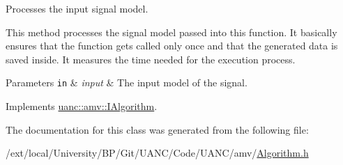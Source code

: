 Processes the input signal model. 

This method processes the signal model passed into this function. It basically ensures that the function gets called only once and that the generated data is saved inside. It measures the time needed for the execution process.


\begin{DoxyParams}[1]{Parameters}
\mbox{\tt in}  & {\em input} & The input model of the signal. \\
\hline
\end{DoxyParams}


Implements \hyperlink{classuanc_1_1amv_1_1_i_algorithm_a14dd1e42a421c48b8874e42933daa0b9}{uanc\+::amv\+::\+I\+Algorithm}.



The documentation for this class was generated from the following file\+:\begin{DoxyCompactItemize}
\item 
/ext/local/\+University/\+B\+P/\+Git/\+U\+A\+N\+C/\+Code/\+U\+A\+N\+C/amv/\hyperlink{_algorithm_8h}{Algorithm.\+h}\end{DoxyCompactItemize}
